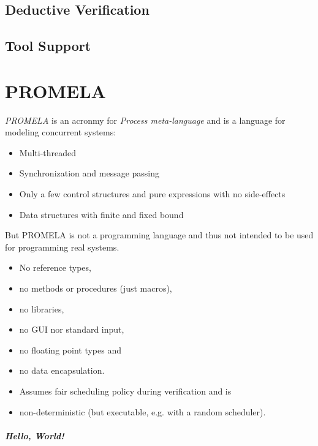 	\section{Deductive Verification} %

	\section{Tool Support} %

\chapter{PROMELA}
	\textit{PROMELA} is an acronmy for \textit{Process meta-language} and is a language for modeling concurrent systems:
	\begin{itemize}
		\item Multi-threaded
		\item Synchronization and message passing
		\item Only a few control structures and pure expressions with no side-effects
		\item Data structures with finite and fixed bound
	\end{itemize}
	But PROMELA is not a programming language and thus not intended to be used for programming real systems.
	\begin{itemize}
		\item No reference types,
		\item no methods or procedures (just macros),
		\item no libraries,
		\item no GUI nor standard input,
		\item no floating point types and
		\item no data encapsulation.
		\item Assumes fair scheduling policy during verification and is
		\item non-deterministic (but executable, e.g. with a random scheduler).
	\end{itemize}

	\paragraph{Hello, World!}
		

